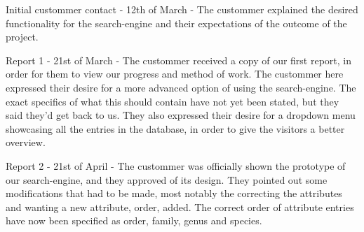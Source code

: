 \documentclass[12pt,a4paper]{article}
\begin{document}
	
	Initial custommer contact - 12th of March - The custommer explained the desired functionality for the search-engine and their expectations of the outcome of the project. 

	 
	 Report 1 - 21st of March - The custommer received a copy of our first report, in order for them to view our progress and method of work.
	 The custommer here expressed their desire for a more advanced option of using the search-engine. The exact specifics of what this should contain have not yet been stated, but they said they'd get back to us.
	 They also expressed their desire for a dropdown menu showcasing all the entries in the database, in order to give the visitors a better overview.

	
	Report 2 - 21st of April - The custommer was officially shown the prototype of our search-engine, and they approved of its design. They pointed out some modifications that had to be made, most notably the correcting the attributes and wanting a new attribute, order, added. The correct order of attribute entries have now been specified as order, family, genus and species.
\end{document}
